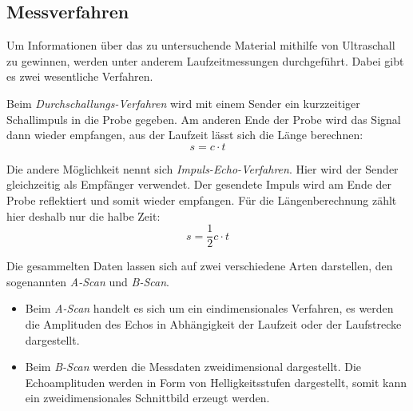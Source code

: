 \subsection{Messverfahren}
\label{sec:Messverfahren}
Um Informationen über das zu untersuchende Material mithilfe von Ultraschall zu gewinnen, werden unter anderem
Laufzeitmessungen durchgeführt. Dabei gibt es zwei wesentliche Verfahren.

Beim \textit{Durchschallungs-Verfahren} wird mit einem Sender ein kurzzeitiger Schallimpuls in die Probe gegeben.
Am anderen Ende der Probe wird das Signal dann wieder empfangen, aus der Laufzeit lässt sich die Länge berechnen:
\begin{equation}
    \label{eq:Durchschall}
    s=c\cdot t
\end{equation}

Die andere Möglichkeit nennt sich \textit{Impuls-Echo-Verfahren}. Hier wird der Sender gleichzeitig als Empfänger verwendet.
Der gesendete Impuls wird am Ende der Probe reflektiert und somit wieder empfangen.
Für die Längenberechnung zählt hier deshalb nur die halbe Zeit:
\begin{equation}
    \label{eq:Impuls-Echo}
    s=\frac{1}{2} c\cdot t
\end{equation}

Die gesammelten Daten lassen sich auf zwei verschiedene Arten darstellen,
den sogenannten \textit{A-Scan} und \textit{B-Scan}.
\begin{itemize}
    \item Beim \textit{A-Scan} handelt es sich um ein eindimensionales Verfahren, es werden die Amplituden
    des Echos in Abhängigkeit der Laufzeit oder der Laufstrecke dargestellt.
    \item Beim \textit{B-Scan} werden die Messdaten zweidimensional dargestellt. Die Echoamplituden werden
    in Form von Helligkeitsstufen dargestellt, somit kann ein zweidimensionales Schnittbild erzeugt werden.
\end{itemize}
